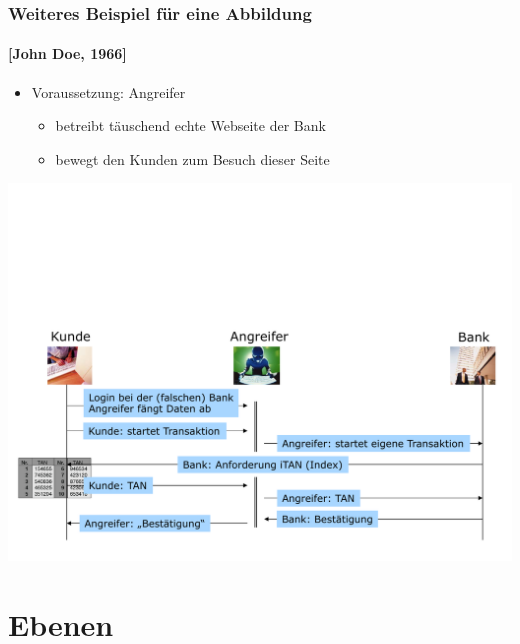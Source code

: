 \documentclass[t]{beamer}
\begin{document}
\begin{frame}
	\frametitle{Weiteres Beispiel für eine Abbildung}
	\framesubtitle{[John Doe, 1966] }
	\begin{itemize}
		\item Voraussetzung: {\color{black} Angreifer} 
			\begin{itemize}
				\item betreibt täuschend echte Webseite der Bank
				\item bewegt den Kunden zum Besuch dieser Seite
			\end{itemize}
	\end{itemize}
	\vspace{\fill}
	\begin{center}
		\includegraphics[width=\textwidth]{../pic/abbildung3.pdf}
	\end{center}
\end{frame}

\section{Ebenen} %
\end{document}
